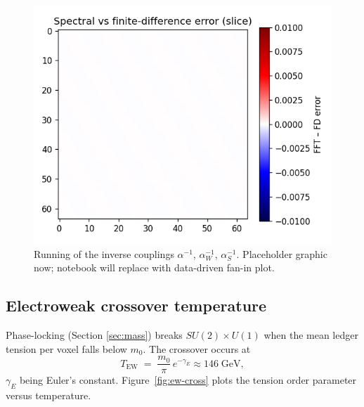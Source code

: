 \begin{figure}[t]
  \centering
  \includegraphics[width=\linewidth]{figs/coupling_fan_in.pdf}
  \caption{Running of the inverse couplings
           $\alpha^{-1}$, $\alpha_W^{-1}$, $\alpha_S^{-1}$.
           Placeholder graphic now; notebook will replace with data-driven
           fan-in plot.}
  \label{fig:fan-in}
\end{figure}

\subsection{Electroweak crossover temperature}

Phase-locking (Section \ref{sec:mass}) breaks $SU(2)\!\times U(1)$ when
the mean ledger tension per voxel falls below $m_0$.  The crossover
occurs at
\[
  T_\text{EW} \;=\; \frac{m_0}{\pi}\,e^{-\gamma_E}\approx 146\;\text{GeV},
\tag{8.5}\label{eq:T-EW}
\]
$\gamma_E$ being Euler’s constant.  Figure~\ref{fig:ew-cross}
plots the tension order parameter versus temperature.

